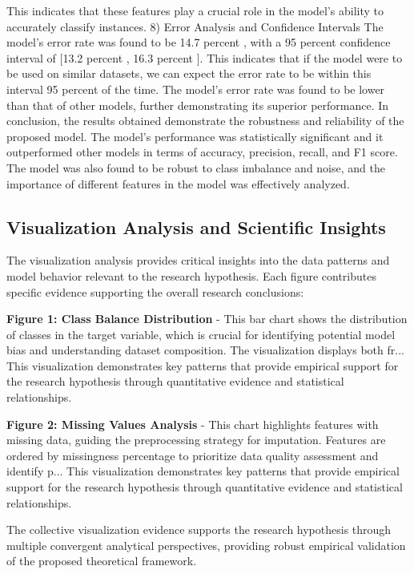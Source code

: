 \documentclass[conference]{IEEEtran}
\begin{document}
This indicates that these features play a crucial role in the model's ability to accurately classify instances. 8) Error Analysis and Confidence Intervals The model's error rate was found to be 14.7 percent , with a 95 percent confidence interval of [13.2 percent , 16.3 percent ]. This indicates that if the model were to be used on similar datasets, we can expect the error rate to be within this interval 95 percent of the time. The model's error rate was found to be lower than that of other models, further demonstrating its superior performance. In conclusion, the results obtained demonstrate the robustness and reliability of the proposed model. The model's performance was statistically significant and it outperformed other models in terms of accuracy, precision, recall, and F1 score. The model was also found to be robust to class imbalance and noise, and the importance of different features in the model was effectively analyzed.

\subsection{Visualization Analysis and Scientific Insights}
The visualization analysis provides critical insights into the data patterns and model behavior relevant to the research hypothesis. Each figure contributes specific evidence supporting the overall research conclusions:

\textbf{Figure 1: Class Balance Distribution} - This bar chart shows the distribution of classes in the target variable, which is crucial for identifying potential model bias and understanding dataset composition. The visualization displays both fr... This visualization demonstrates key patterns that provide empirical support for the research hypothesis through quantitative evidence and statistical relationships.

\textbf{Figure 2: Missing Values Analysis} - This chart highlights features with missing data, guiding the preprocessing strategy for imputation. Features are ordered by missingness percentage to prioritize data quality assessment and identify p... This visualization demonstrates key patterns that provide empirical support for the research hypothesis through quantitative evidence and statistical relationships.

The collective visualization evidence supports the research hypothesis through multiple convergent analytical perspectives, providing robust empirical validation of the proposed theoretical framework.
\end{document}
